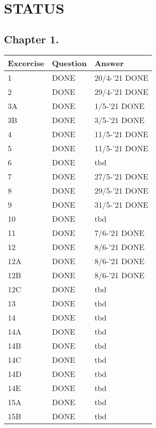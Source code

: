 \section{STATUS}

\subsection*{Chapter 1.}

    \begin{tabular}{|l|l|l|}
        \hline
        \rowcolor[HTML]{EFEFEF}
        {\color[HTML]{000000} Excercise } & {\color[HTML]{000000} Question } & {\color[HTML]{000000} Answer } \\ \hline
        1 & DONE & 20/4-'21 DONE \\ \hline
        2 & DONE & 29/4-'21 DONE \\ \hline
        3A & DONE & 1/5-'21 DONE \\ \hline
        3B & DONE & 3/5-'21 DONE \\ \hline
        4 & DONE & 11/5-'21 DONE \\ \hline
        5 & DONE & 11/5-'21 DONE \\ \hline
        6 & DONE & tbd \\ \hline
        7 & DONE & 27/5-'21 DONE \\ \hline
        8 & DONE & 29/5-'21 DONE \\ \hline
        9 & DONE & 31/5-'21 DONE \\ \hline
        10 & DONE & tbd \\ \hline
        11 & DONE & 7/6-'21 DONE \\ \hline
        12 & DONE & 8/6-'21 DONE \\ \hline
        12A & DONE & 8/6-'21 DONE \\ \hline
        12B & DONE & 8/6-'21 DONE \\ \hline
        12C & DONE & tbd \\ \hline
        13 & DONE & tbd \\ \hline
        14 & DONE & tbd \\ \hline
        14A & DONE & tbd \\ \hline
        14B & DONE & tbd \\ \hline
        14C & DONE & tbd \\ \hline
        14D & DONE & tbd \\ \hline
        14E & DONE & tbd \\ \hline
        15A & DONE & tbd \\ \hline
        15B & DONE & tbd \\ \hline
    \end{tabular}


